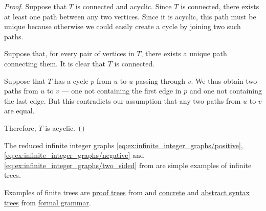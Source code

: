\begin{proof}
   Suppose that \( T \) is connected and acyclic. Since \( T \) is connected, there exists at least one path between any two vertices. Since it is acyclic, this path must be unique because otherwise we could easily create a cycle by joining two such paths.

   Suppose that, for every pair of vertices in \( T \), there exists a unique path connecting them. It is clear that \( T \) is connected.

  Suppose that \( T \) has a cycle \( p \) from \( u \) to \( u \) passing through \( v \). We thus obtain two paths from \( u \) to \( v \) --- one not containing the first edge in \( p \) and one not containing the last edge. But this contradicts our assumption that any two paths from \( u \) to \( v \) are equal.

  Therefore, \( T \) is acyclic.
\end{proof}

\begin{example}\label{ex:def:tree}
  The reduced infinite integer graphs \eqref{eq:ex:infinite_integer_graphs/positive}, \eqref{eq:ex:infinite_integer_graphs/negative} and \eqref{eq:ex:infinite_integer_graphs/two_sided} from  are simple examples of infinite trees.

  Examples of finite trees are \hyperref[def:proof_tree]{proof trees} from  and \hyperref[def:concrete_syntax_tree]{concrete} and \hyperref[def:abstract_syntax_tree]{abstract syntax trees} from \hyperref[def:formal_grammar]{formal grammar}.
\end{example}

